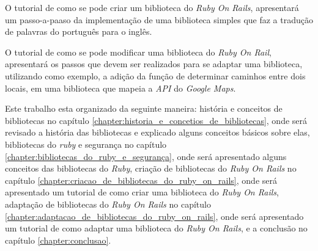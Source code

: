 O tutorial de como se pode criar um biblioteca do \emph{Ruby On Rails}, apresentará
um passo-a-paaso da implementação de uma biblioteca simples que faz a tradução de
palavras do português para o inglês.

O tutorial de como se pode modificar uma biblioteca do \emph{Ruby On Rail}, apresentará
os passos que devem ser realizados para se adaptar uma biblioteca, utilizando como exemplo,
a adição da função de determinar caminhos entre dois locais, em uma biblioteca que mapeia a
\emph{API} do \emph{Google Maps}.

Este trabalho esta organizado da seguinte maneira: história e conceitos de
bibliotecas no capítulo \ref{chapter:historia_e_concetios_de_bibliotecas}, onde será
revisado a história das bibliotecas e explicado alguns conceitos básicos sobre elas,
bibliotecas do \emph{ruby} e segurança no capítulo \ref{chapter:bibliotecas_do_ruby_e_segurança},
onde será apresentado alguns conceitos das bibliotecas do \emph{Ruby}, criação de
bibliotecas do \emph{Ruby On Rails} no capítulo 
\ref{chapter:criacao_de_bibliotecas_do_ruby_on_rails}, onde será apresentado
um tutorial de como criar uma biblioteca do \emph{Ruby On Rails}, adaptação de
bibliotecas do \emph{Ruby On Rails} no capítulo 
\ref{chapter:adaptacao_de_bibliotecas_do_ruby_on_rails}, onde será apresentado
um tutorial de como adaptar uma biblioteca do \emph{Ruby On Rails}, e a
conclusão no capítulo \ref{chapter:conclusao}.